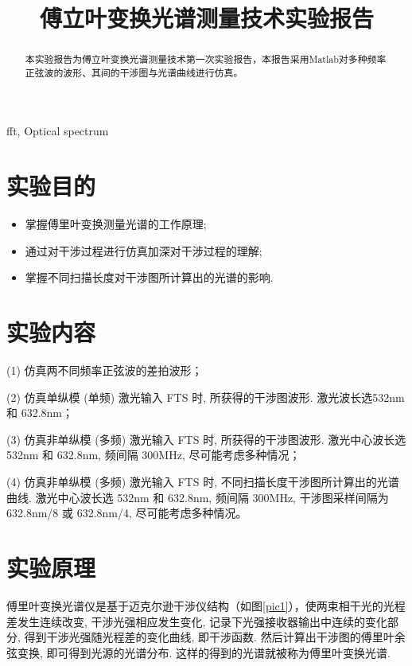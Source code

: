 \documentclass[conference]{IEEEtran}
\begin{document}
\title{傅立叶变换光谱测量技术实验报告}

\author{
}

\maketitle

\begin{abstract}
本实验报告为傅立叶变换光谱测量技术第一次实验报告，本报告采用Matlab对多种频率正弦波的波形、其间的干涉图与光谱曲线进行仿真。
\end{abstract}

\begin{IEEEkeywords}
fft, Optical spectrum
\end{IEEEkeywords}

\section{实验目的}
\begin{itemize}
\item 掌握傅里叶变换测量光谱的工作原理;
\item 通过对干涉过程进行仿真加深对干涉过程的理解;
\item 掌握不同扫描长度对干涉图所计算出的光谱的影响.
\end{itemize}

\section{ 实验内容}
(1) 仿真两不同频率正弦波的差拍波形；

(2) 仿真单纵模 (单频) 激光输入 FTS 时, 所获得的干涉图波形. 激光波长选532nm 和 632.8nm；

(3) 仿真非单纵模 (多频) 激光输入 FTS 时, 所获得的干涉图波形. 激光中心波长选 532nm 和 632.8nm, 频间隔 300MHz, 尽可能考虑多种情况；

(4) 仿真非单纵模 (多频) 激光输入 FTS 时, 不同扫描长度干涉图所计算出的光谱曲线. 激光中心波长选 532nm 和 632.8nm, 频间隔 300MHz, 干涉图采样间隔为 632.8nm/8 或 632.8nm/4, 尽可能考虑多种情况。

\section{实验原理}
傅里叶变换光谱仪是基于迈克尔逊干涉仪结构（如图\ref{pic1}），使两束相干光的光程差发生连续改变, 干涉光强相应发生变化, 记录下光强接收器输出中连续的变化部分, 得到干涉光强随光程差的变化曲线, 即干涉函数. 然后计算出干涉图的傅里叶余弦变换, 即可得到光源的光谱分布. 这样的得到的光谱就被称为傅里叶变换光谱. 
\end{document}
